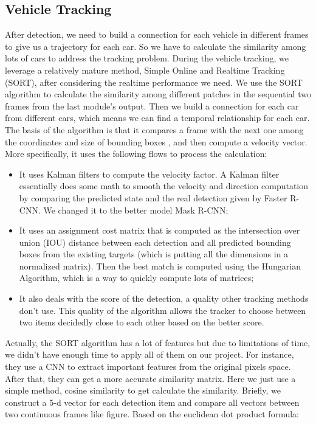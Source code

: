 \documentclass[10pt,twocolumn,letterpaper]{article}
\begin{document}
\subsection{Vehicle Tracking}

After detection, we need to build a connection for each vehicle in different frames to give us a trajectory for each car. So we have to calculate the similarity among lots of cars to address the tracking problem.
During the vehicle tracking, we leverage a relatively mature method, Simple Online and Realtime Tracking (SORT)\cite{bewley2016simple}, after considering the realtime performance we need. We use the SORT algorithm to calculate the similarity among different patches in the sequential two frames from the last module’s output. Then we build a connection for each car from different cars, which means we can find a temporal relationship for each car. The basis of the algorithm is that it compares a frame with the next one among the coordinates and size of bounding boxes , and then compute a velocity vector. More specifically, it uses the following flows to process the calculation:

\begin{itemize}
	\item It uses Kalman filters to compute the velocity factor. A Kalman filter essentially does some math to smooth the velocity and direction computation by comparing the predicted state and the real detection given by Faster R-CNN. We changed it to the better model Mask R-CNN;
	\item It uses an assignment cost matrix that is computed as the intersection over union (IOU) distance between each detection and all predicted bounding boxes from the existing targets (which is putting all the dimensions in a normalized matrix). Then the best match is computed using the Hungarian Algorithm, which is a way to quickly compute lots of matrices;
	\item It also deals with the score of the detection, a quality other tracking methods don't use. This quality of the algorithm allows the tracker to choose between two items decidedly close to each other based on the better score.
\end{itemize}

Actually, the SORT algorithm has a lot of features but due to limitations of time, we didn't have enough time to apply all of them on our project. For instance, they use a CNN to extract important features from the original pixels space. After that, they can get a more accurate similarity matrix. Here we just use a simple method, cosine similarity to get calculate the similarity. Briefly, we construct a 5-d vector for each detection item and compare all vectors between two continuous frames like figure. Based on the euclidean dot product formula:
\end{document}
